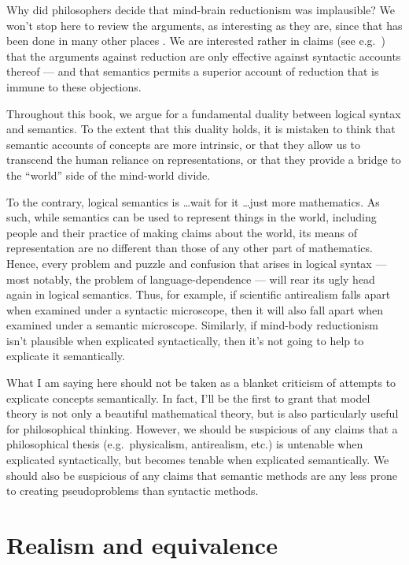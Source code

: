 Why did philosophers decide that mind-brain reductionism was
implausible?  We won't stop here to review the arguments, as
interesting as they are, since that has been done in many other places
\citep[see][]{bickle-sep}.  We are interested rather in claims (see
e.g.\ \cite{bickle}) that the arguments against reduction are only
effective against syntactic accounts thereof --- and that semantics
permits a superior account of reduction that is immune to these
objections.

Throughout this book, we argue for a fundamental duality between
logical syntax and semantics.  To the extent that this duality holds,
it is mistaken to think that semantic accounts of concepts are more
intrinsic, or that they allow us to transcend the human reliance on
representations, or that they provide a bridge to the ``world'' side
of the mind-world divide.

To the contrary, logical semantics is \dots wait for it \dots just
more mathematics.  As such, while semantics can be used to represent
things in the world, including people and their practice of making
claims about the world, its means of representation are no different
than those of any other part of mathematics.  Hence, every problem and
puzzle and confusion that arises in logical syntax --- most notably,
the problem of language-dependence --- will rear its ugly head again
in logical semantics.  Thus, for example, if scientific antirealism
falls apart when examined under a syntactic microscope, then it will
also fall apart when examined under a semantic microscope.  Similarly,
if mind-body reductionism isn't plausible when explicated
syntactically, then it's not going to help to explicate it
semantically.

What I am saying here should not be taken as a blanket criticism of
attempts to explicate concepts semantically.  In fact, I'll be the
first to grant that model theory is not only a beautiful mathematical
theory, but is also particularly useful for philosophical thinking.
However, we should be suspicious of any claims that a philosophical
thesis (e.g.\ physicalism, antirealism, etc.) is untenable when
explicated syntactically, but becomes tenable when explicated
semantically.  We should also be suspicious of any claims that
semantic methods are any less prone to creating pseudoproblems than
syntactic methods.

\section*{Realism and equivalence}

